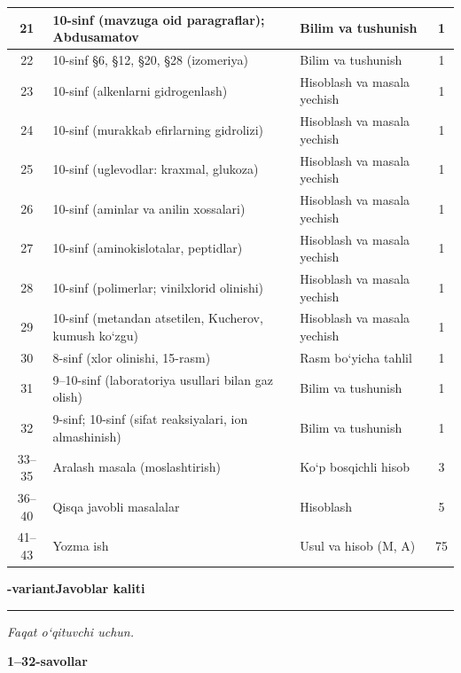\documentclass[11pt,a4paper]{article}
\newcommand{\hdrpill}[1]{\begin{tikzpicture}[baseline=0pt]\node[fill=ygreen,text=white,rounded corners=8pt,inner xsep=10pt,inner ysep=5pt,font=\fontsize{13}{15}\bfseries\selectfont] at (0,0.475){#1};\end{tikzpicture}}
\newcommand{\curvar}{}\fancyhead[R]{\hdrpill{\curvar}}
\begin{document}
{\begin{longtable}{|c|p{7.2cm}|p{5.4cm}|c|}
21 & 10-sinf (mavzuga oid paragraflar); Abdusamatov & Bilim va tushunish & 1\\\hline
22 & 10-sinf \S{}6, \S{}12, \S{}20, \S{}28 (izomeriya) & Bilim va tushunish & 1\\\hline
23 & 10-sinf (alkenlarni gidrogenlash) & Hisoblash va masala yechish & 1\\\hline
24 & 10-sinf (murakkab efirlarning gidrolizi) & Hisoblash va masala yechish & 1\\\hline
25 & 10-sinf (uglevodlar: kraxmal, glukoza) & Hisoblash va masala yechish & 1\\\hline
26 & 10-sinf (aminlar va anilin xossalari) & Hisoblash va masala yechish & 1\\\hline
27 & 10-sinf (aminokislotalar, peptidlar) & Hisoblash va masala yechish & 1\\\hline
28 & 10-sinf (polimerlar; vinilxlorid olinishi) & Hisoblash va masala yechish & 1\\\hline
29 & 10-sinf (metandan atsetilen, Kucherov, kumush ko`zgu) & Hisoblash va masala yechish & 1\\\hline
30 & 8-sinf (xlor olinishi, 15-rasm) & Rasm bo`yicha tahlil & 1\\\hline
31 & 9--10-sinf (laboratoriya usullari bilan gaz olish) & Bilim va tushunish & 1\\\hline
32 & 9-sinf; 10-sinf (sifat reaksiyalari, ion almashinish) & Bilim va tushunish & 1\\\hline
33--35 & Aralash masala (moslashtirish) & Ko`p bosqichli hisob & 3\\\hline
36--40 & Qisqa javobli masalalar & Hisoblash & 5\\\hline
41--43 & Yozma ish & Usul va hisob (M, A) & 75\\\hline
\end{longtable}}
\renewcommand{\curvar}{Javoblar}
\newpage
\noindent\textbf{\fontsize{13}{15}-variant}\hfill \textbf{Javoblar kaliti}\par\smallskip\hrule\smallskip
\textit{Faqat o`qituvchi uchun.}\par\medskip
\noindent\textbf{1--32-savollar}\par\smallskip
\end{document}
